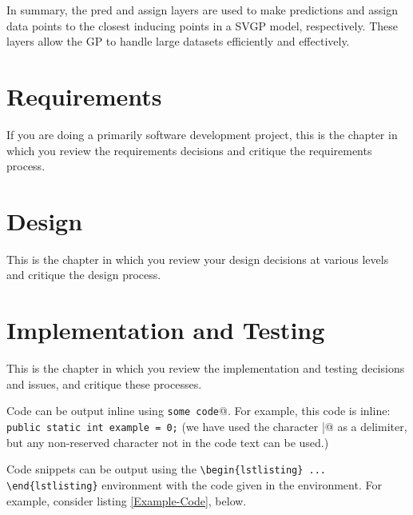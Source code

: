 \documentclass[12pt,a4paper]{report}
\begin{document}
In summary, the pred and assign layers are used to make predictions and assign data points to the closest inducing points in a SVGP model, respectively. 
These layers allow the GP to handle large datasets efficiently and effectively.


\chapter{Requirements}

If you are doing a primarily software development project, this is the chapter in which you review the requirements decisions and critique the requirements process.

\chapter{Design}

This is the chapter in which you review your design decisions at various
levels and critique the design process.

\chapter{Implementation and Testing}

This is the chapter in which you review the implementation and testing decisions and issues, and critique these processes.

Code can be output inline using \verb@\lstinline|some code|@.  For example, this code is inline: \lstinline|public static int example = 0;| (we have used the character \verb@|@ as a delimiter, but any non-reserved character not in the code text can be used.)

Code snippets can be output using the \verb|\begin{lstlisting} ... \end{lstlisting}|
environment with the code given in the environment. For example, consider listing \ref{Example-Code}, below.
\end{document}
